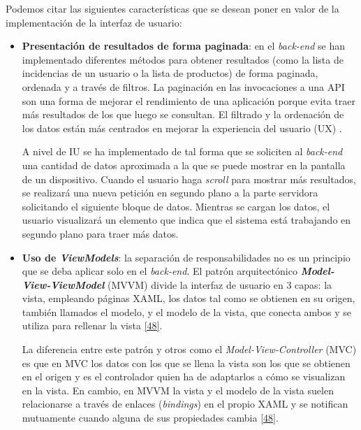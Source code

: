 \documentclass[11pt,spanish,listoffigures]{tfgetsinf}
\begin{document}
Podemos citar las siguientes características que se desean poner en valor de la implementación de la interfaz de usuario:

\begin{itemize}

\item \textbf{Presentación de resultados de forma paginada}: en el \textit{back-end} se han implementado diferentes métodos para obtener resultados (como la lista de incidencias de un usuario o la lista de productos) de forma paginada, ordenada y a través de filtros. La paginación en las invocaciones a una API son una forma de mejorar el rendimiento de una aplicación porque evita traer más resultados de los que luego se consultan. El filtrado y la ordenación de los datos están más centrados en mejorar la experiencia del usuario (UX) \cite{Gilling2018}.

A nivel de IU se ha implementado de tal forma que se soliciten al \textit{back-end} una cantidad de datos aproximada a la que se puede mostrar en la pantalla de un dispositivo. Cuando el usuario haga \textit{scroll} para mostrar más resultados, se realizará una nueva petición en segundo plano a la parte servidora solicitando el siguiente bloque de datos. Mientras se cargan los datos, el usuario visualizará un elemento que indica que el sistema está trabajando en segundo plano para traer más datos.


\item \textbf{Uso de \textit{ViewModels}}: la separación de responsabilidades no es un principio que se deba aplicar solo en el \textit{back-end}. El patrón arquitectónico \textbf{\textit{Model-View-ViewModel}} (MVVM) divide la interfaz de usuario en 3 capas: la vista, empleando páginas XAML, los datos tal como se obtienen en su origen, también llamados el modelo, y el modelo de la vista, que conecta ambos y se utiliza para rellenar la vista \hyperlink{page.80}{[48]}.

La diferencia entre este patrón y otros como el \textit{Model-View-Controller} (MVC) es que en MVC los datos con los que se llena la vista son los que se obtienen en el origen y es el controlador quien ha de adaptarlos a cómo se visualizan en la vista. En cambio, en MVVM la vista y el modelo de la vista suelen relacionarse a través de enlaces (\textit{bindings}) en el propio XAML y se notifican mutuamente cuando alguna de sus propiedades cambia \hyperlink{page.80}{[48]}.


\end{itemize}
\end{document}
